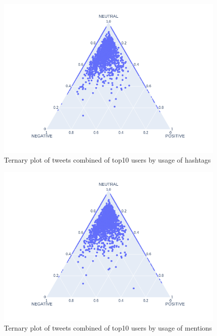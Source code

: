 \documentclass[conference]{IEEEtran}
\begin{document}
\begin{figure}
\includegraphics[scale=0.4]{figures/sentiment_ternary_amount_hashtags}
\caption{Ternary plot of tweets combined of top10 users by usage of hashtags }
\label{fig:sentiment-ternary-user-hashtag}
\end{figure}

\begin{figure}
\includegraphics[scale=0.4]{figures/sentiment_ternary_amount_mentions}
\caption{Ternary plot of tweets combined of top10 users by usage of mentions }
\label{fig:sentiment-ternary-user-mention}
\end{figure}
\end{document}
